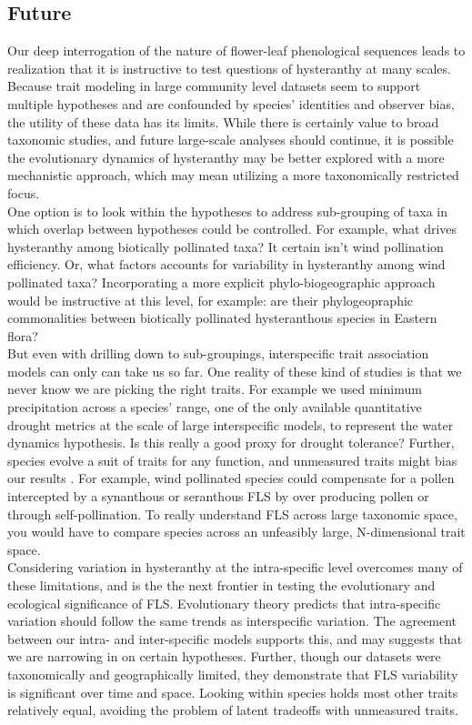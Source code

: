 \documentclass[12pt]{article}\usepackage[]{graphicx}\usepackage[]{color}
\begin{document}
\subsection*{Future}
 \indent\indent Our deep interrogation of the nature of flower-leaf phenological sequences leads to realization that it is instructive to test questions of hysteranthy at many scales. Because trait modeling in large community level datasets seem to support multiple hypotheses and are confounded by species' identities and observer bias, the utility of these data has its limits. While there is certainly value to broad taxonomic studies, and future large-scale analyses should continue, it is possible the evolutionary dynamics of hysteranthy may be better explored with a more mechanistic approach, which may mean utilizing a more taxonomically restricted focus.\\
\indent One option is to look within the hypotheses to address sub-grouping of taxa in which overlap between hypotheses could be controlled. For example, what drives hysteranthy among biotically pollinated taxa? It certain isn't wind pollination efficiency. Or, what factors accounts for variability in hysteranthy among wind pollinated taxa? Incorporating a more explicit phylo-biogeographic approach would be instructive at this level, for example: are their phylogeopraphic commonalities between biotically pollinated hysteranthous species in Eastern flora?\\
\indent But even with drilling down to sub-groupings, interspecific trait association models can only can take us so far. One reality of these kind of studies is that we never know we are picking the right traits. For example we used minimum precipitation across a species' range, one of the only available quantitative drought metrics at the scale of large interspecific models, to represent the water dynamics hypothesis. Is this really a good proxy for drought tolerance? Further, species evolve a suit of traits for any function, and unmeasured traits might bias our results \citep{Davies2019}. For example, wind pollinated species could compensate for a pollen intercepted by a synanthous or seranthous FLS by over producing pollen or through self-pollination. To really understand FLS across large taxonomic space, you would have to compare species across an unfeasibly large, N-dimensional trait space.\\
\indent Considering variation in hysteranthy at the intra-specific level overcomes many of these limitations, and is the the next frontier in testing the evolutionary and ecological significance of FLS. Evolutionary theory predicts that intra-specific variation should follow the same trends as interspecific variation. The agreement between our intra- and inter-specific models supports this, and may suggests that we are narrowing in on certain hypotheses. Further, though our datasets were taxonomically and geographically limited, they demonstrate that FLS variability is significant over time and space. Looking within species holds most other traits relatively equal, avoiding the problem of latent tradeoffs with unmeasured traits.\\
\end{document}

